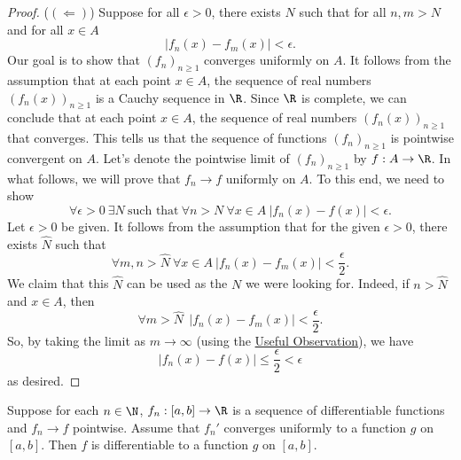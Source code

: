 \begin{proof}
    (\( (\Longleftarrow) \)) Suppose for all \( \epsilon > 0  \), there exists \( N  \) such that for all \( n,m > N  \) and for all \( x \in A  \)
    \[  | {f}_{n}(x) - {f}_{m}(x) |  < \epsilon. \]
    Our goal is to show that \( ({f}_{n})_{n \geq 1 } \) converges uniformly on \( A  \). It follows from the assumption that at each point \( x \in A  \), the sequence of real numbers \( ({f}_{n}(x))_{n \geq 1 } \) is a Cauchy sequence in \( \R  \). Since \( \R \) is complete, we can conclude that at each point \( x \in A  \), the sequence of real numbers \( ({f}_{n}(x))_{n \geq 1} \) that converges. This tells us that the sequence of functions \( ({f}_{n})_{n \geq 1 } \) is pointwise convergent on \( A  \). Let's denote the pointwise limit of \( ({f}_{n})_{n \geq 1 }  \) by \( f: A \to \R  \). In what follows, we will prove that \( {f}_{n} \to f  \) uniformly on \( A  \). To this end, we need to show   
    \[  \forall \epsilon > 0  \ \exists N  \ \text{such that} \ \forall n > N \ \forall x \in A \ | {f}_{n}(x) - f(x) |  < \epsilon. \] 
    Let \( \epsilon > 0  \) be given. It follows from the assumption that for the given \( \epsilon> 0  \), there exists \( \hat{N} \) such that 
    \[  \forall m,n > \hat{N} \ \forall x \in A \ | {f}_{n}(x) - {f}_{m}(x) |  < \frac{ \epsilon }{ 2 }. \]
    We claim that this \( \hat{N} \) can be used as the \( N  \) we were looking for. Indeed, if \( n > \hat{N} \) and \( x \in A  \), then 
    \[  \forall m > \hat{N} \ \ | {f}_{n}(x) - {f}_{m}(x) |  < \frac{ \epsilon }{ 2 }.  \]
So, by taking the limit as \( m \to \infty   \) (using the {\hyperref[Useful Observation]{Useful Observation}}), we have 
\[ | {f}_{n}(x) - f(x) |  \leq \frac{ \epsilon }{ 2 }  < \epsilon  \]
as desired.
\end{proof}

\begin{theorem}[Rudin 7.17]
    Suppose for each \( n \in \N \), \( {f}_{n} : [a,b] \to \R  \) is a sequence of differentiable functions and \( {f}_{n} \to f  \) pointwise. Assume that \( {f}_{n}'  \) converges uniformly to a function \( g  \) on \( [a,b] \). Then \( f \) is differentiable to a function \( g  \) on \( [a,b] \).
\end{theorem}

